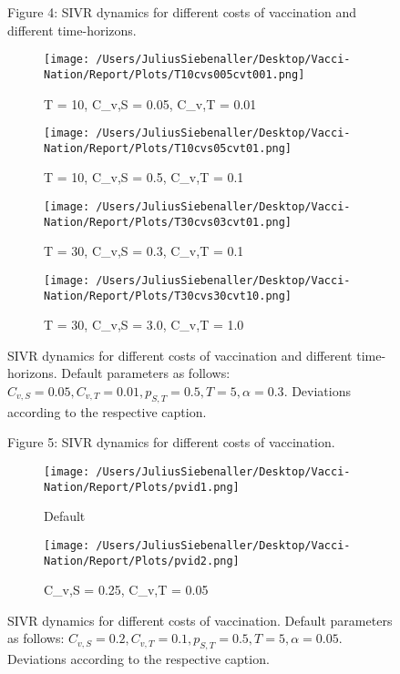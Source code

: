 \documentclass[11pt]{article}
\begin{document}
\begin{figure}[htbp]%
\centering
	Figure 4: SIVR dynamics for different costs of vaccination and different time-horizons. \\  
    \begin{subfigure}[b]{0.45\textwidth}
    \texttt{[image: /Users/JuliusSiebenaller/Desktop/Vacci-Nation/Report/Plots/T10cvs005cvt001.png]}
    \caption{T = 10, C_{v,S} = 0.05, C_{v,T} = 0.01}
    \label{fig:4a}
  \end{subfigure}
    \begin{subfigure}[b]{0.45\textwidth}
    \texttt{[image: /Users/JuliusSiebenaller/Desktop/Vacci-Nation/Report/Plots/T10cvs05cvt01.png]}
    \caption{T = 10, C_{v,S} = 0.5, C_{v,T} = 0.1}
    \label{fig:4b}
  \end{subfigure}
  \begin{subfigure}[b]{0.45\textwidth}
    \texttt{[image: /Users/JuliusSiebenaller/Desktop/Vacci-Nation/Report/Plots/T30cvs03cvt01.png]}
    \caption{T = 30, C_{v,S} = 0.3, C_{v,T} = 0.1}
    \label{fig:4c}
  \end{subfigure}   
  \begin{subfigure}[b]{0.45\textwidth}
    \texttt{[image: /Users/JuliusSiebenaller/Desktop/Vacci-Nation/Report/Plots/T30cvs30cvt10.png]}
    \caption{T = 30, C_{v,S} = 3.0, C_{v,T} = 1.0}
    \label{fig:4d}
  \end{subfigure}
   \caption{SIVR dynamics for different costs of vaccination and different time-horizons. Default parameters as follows: \(C_{v,S} = 0.05, C_{v,T} = 0.01, p_{S,T}=0.5, T=5, \alpha=0.3\). Deviations according to the respective caption.}
\end{figure}

\begin{figure}[htbp]%
\centering
	Figure 5: SIVR dynamics for different costs of vaccination. \\  
  \begin{subfigure}[b]{0.45\textwidth}
    \texttt{[image: /Users/JuliusSiebenaller/Desktop/Vacci-Nation/Report/Plots/pvid1.png]}
    \caption{Default}
    \label{fig:5a}
  \end{subfigure}   
  \begin{subfigure}[b]{0.45\textwidth}
    \texttt{[image: /Users/JuliusSiebenaller/Desktop/Vacci-Nation/Report/Plots/pvid2.png]}
    \caption{C_{v,S} = 0.25, C_{v,T} = 0.05}
    \label{fig:5b}
  \end{subfigure}
  \caption{SIVR dynamics for different costs of vaccination. Default parameters as follows: \(C_{v,S} = 0.2, C_{v,T} = 0.1, p_{S,T}=0.5, T=5, \alpha=0.05\). Deviations according to the respective caption. }
\end{figure}








\clearpage


\clearpage
\end{document}
